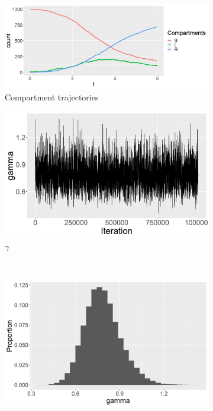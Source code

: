 \documentclass[11pt]{article}
\begin{document}
	
	
	\begin{figure}
		\centering
		\begin{subfigure}[b]{0.42\textwidth}
			\centering
			\includegraphics[width=\textwidth]{E1_trajectories}
			\caption{Compartment trajectories}
			\label{fig:E1_trajectories}
		\end{subfigure}
		\hfill
		\begin{subfigure}[b]{0.41\textwidth}
			\centering
			\includegraphics[width=\textwidth]{E1_no_burn_gamma_tp}
			\caption{$\gamma$}
			\label{fig:traceplot_gamma}
		\end{subfigure}
		\\
		\begin{subfigure}[b]{0.41\textwidth}
			\centering
			\includegraphics[width=\textwidth]{E1_no_burn_gamma_hist}

\end{subfigure}
\end{figure}
\end{document}
